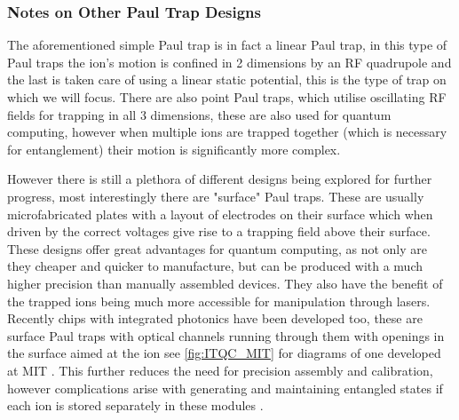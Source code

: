 \subsubsection{Notes on Other Paul Trap Designs}
The aforementioned simple Paul trap is in fact a linear Paul trap, in this type of Paul traps the ion's motion is confined in 2 dimensions by an RF quadrupole and the last is taken care of using a linear static potential, this is the type of trap on which we will focus.
There are also point Paul traps, which utilise oscillating RF fields for trapping in all 3 dimensions, these are also used for quantum computing, however when multiple ions are trapped together (which is necessary for entanglement) their motion is significantly more complex.

However there is still a plethora of different designs being explored for further progress, most interestingly there are "surface" Paul traps.
These are usually microfabricated plates with a layout of electrodes on their surface which when driven by the correct voltages give rise to a trapping field above their surface.
These designs offer great advantages for quantum computing, as not only are they cheaper and quicker to manufacture, but can be produced with a much higher precision than manually assembled devices.
They also have the benefit of the trapped ions being much more accessible for manipulation through lasers.
Recently chips with integrated photonics have been developed too, these are surface Paul traps with optical channels running through them with openings in the surface aimed at the ion see \cref{fig:ITQC_MIT} for diagrams of one developed at MIT \cite{niffeneggerIntegratedMultiwavelengthControl2020}.
This further reduces the need for precision assembly and calibration, however complications arise with generating and maintaining entangled states if each ion is stored separately in these modules \cite{bruzewiczTrappedionQuantumComputing2019}.


